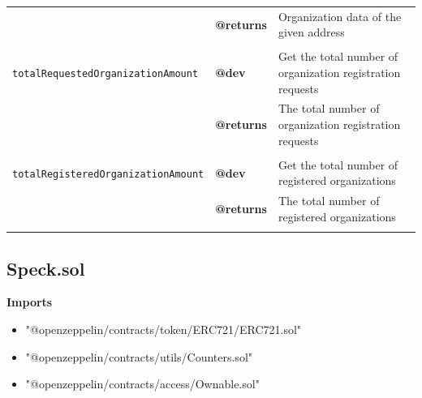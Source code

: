 \begin{table}[H]
{\begin{tabular}{lll}
                          & \textbf{@returns}           & Organization data of the given address                                                                 \\
                          &                   &                                                                                                                \\ \hline
\texttt{totalRequestedOrganizationAmount} &      \textbf{@dev}        & Get the total number of organization registration requests                                                                           \\
                          & \textbf{@returns}           & The total number of organization registration requests                                                                      \\
                          &                   &                                                                                                                \\ \hline
\texttt{totalRegisteredOrganizationAmount} &      \textbf{@dev}        & Get the total number of registered organizations                                                                 \\
                          & \textbf{@returns}           & The total number of registered organizations                                                                      \\
                          &                   &                                                                                                                \\ \hline
\end{tabular}%
}
\end{table}

\newpage
\subsection{Speck.sol}\label{se:speck.sol}
\textbf{Imports}

\begin{itemize}
    \item "@openzeppelin/contracts/token/ERC721/ERC721.sol"
    \item "@openzeppelin/contracts/utils/Counters.sol"
    \item  "@openzeppelin/contracts/access/Ownable.sol"
\end{itemize}


